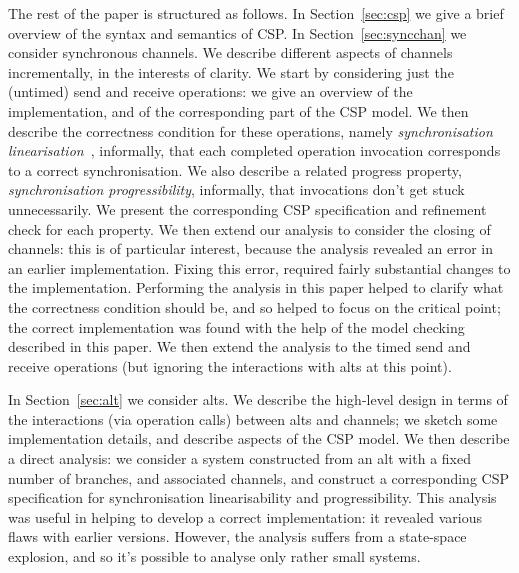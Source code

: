 The rest of the paper is structured as follows.  In Section~\ref{sec:csp} we
give a brief overview of the syntax and semantics of CSP\@.  In
Section~\ref{sec:syncchan} we consider synchronous channels.  We describe
different aspects of channels incrementally, in the interests of clarity.  We
start by considering just the (untimed) send and receive operations: we give
an overview of the implementation, and of the corresponding part of the CSP
model.  We then describe the correctness condition for these operations,
namely \emph{synchronisation linearisation}~\cite{LL:synchronisation},
informally, that each completed operation invocation corresponds to a correct
synchronisation.  We also describe a related progress property,
\emph{synchronisation progressibility}, informally, that invocations don't get
stuck unnecessarily.  We present the corresponding CSP specification and
refinement check for each property.  We then extend our analysis to consider
the closing of channels: this is of particular interest, because the analysis
revealed an error in an earlier implementation.  Fixing this error, required
fairly substantial changes to the implementation.  Performing the analysis in
this paper helped to clarify what the correctness condition should be, and so
helped to focus on the critical point; the correct implementation was found
with the help of the model checking described in this paper.  We then extend
the analysis to the timed send and receive operations (but ignoring the
interactions with alts at this point).

In Section~\ref{sec:alt} we consider alts.  We describe the high-level design
in terms of the interactions (via operation calls) between alts and channels;
we  sketch some implementation details, and describe aspects of the CSP
model.  We then describe a direct analysis: we consider a system constructed
from an alt with a fixed number of branches, and associated channels, and
construct a corresponding CSP specification for synchronisation
linearisability and progressibility.  This analysis was useful in helping to
develop a correct implementation: it revealed various flaws with earlier
versions.  However, the analysis suffers from a state-space explosion, and so
it's possible to analyse only rather small systems.

